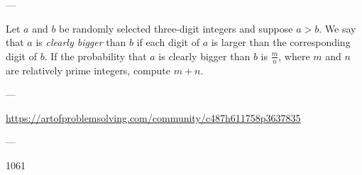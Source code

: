 
---

Let $a$ and $b$ be randomly selected three-digit integers and suppose $a > b$.
We say that $a$ is \emph{clearly bigger} than $b$ if each digit of $a$ is larger than the corresponding digit of $b$.
If the probability that $a$ is clearly bigger than $b$ is $\tfrac mn$, where $m$ and $n$ are relatively prime integers,
compute $m+n$.

---

\url{https://artofproblemsolving.com/community/c487h611758p3637835}

---

1061
